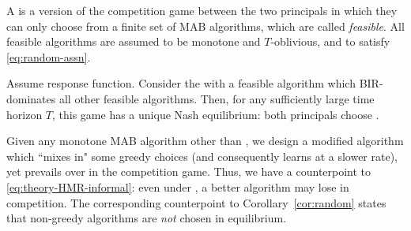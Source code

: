 


\begin{definition}\label{def:restricted-competition}
A \emph{\FiniteGame} is a version of the competition game between the two principals in which they can only choose from a finite set of MAB algorithms, which are called \emph{feasible}. All feasible algorithms are assumed to be
monotone and $T$-oblivious, and to satisfy \eqref{eq:random-assn}.
\end{definition}

\begin{corollary}\label{cor:random}
Assume \HardMaxRandom response function. Consider the \FiniteGame with a feasible algorithm \alg which BIR-dominates all other feasible algorithms. Then, for any sufficiently large time horizon $T$, this game has a unique Nash equilibrium: both principals choose \alg.
\end{corollary}



Given any monotone MAB algorithm \alg other than \DynGreedy, we design a modified algorithm which ``mixes in" some greedy choices (and consequently learns at a slower rate), yet prevails over \alg in the competition game. Thus, we have a counterpoint to \eqref{eq:theory-HMR-informal}: even under \HardMaxRandom, a better algorithm may lose in competition. The corresponding counterpoint to Corollary~\ref{cor:random} states that non-greedy algorithms are \emph{not} chosen in equilibrium.

